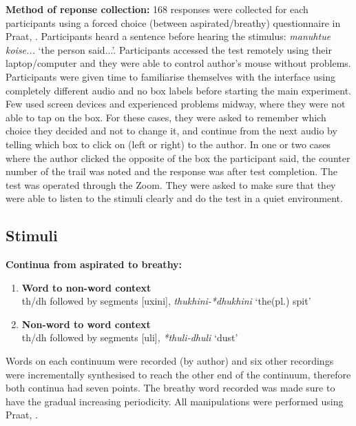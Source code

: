 \documentclass[12pt, english]{article}
\begin{document}
\textbf{Method of reponse collection:} 168 responses were collected for each participants using a forced choice (between aspirated/breathy) questionnaire in Praat, \cite{boersma2001praat}. Participants heard a sentence before hearing the stimulus: \textit{manuhtue koise...} `the person said...'. Participants accessed the test remotely using their laptop/computer and they were able to control author's mouse without problems. Participants were given time to familiarise themselves with the interface using completely different audio and no box labels before starting the main experiment. Few used screen devices and experienced problems midway, where they were not able to tap on the box. For these cases, they were asked to remember which choice they decided and not to change it, and continue from the next audio by telling which box to click on (left or right) to the author. In one or two cases where the author clicked the opposite of the box the participant said, the counter number of the trail was noted and the response was after test completion. The test was operated through the Zoom. They were asked to make sure that they were able to listen to the stimuli clearly and do the test in a quiet environment.


\subsection*{Stimuli}
\textbf{Continua from aspirated to breathy:} \par
\begin{enumerate}
    \item \textbf{Word to non-word context} \\
    th/dh followed by segments [uxini], \textit{thukhini-*dhukhini} `the(pl.) spit'
    \item \textbf{Non-word to word context} \\
    th/dh followed by segments [uli], \textit{*thuli-dhuli} `dust' \par
\end{enumerate}

Words on each continuum were recorded (by author) and six other recordings were incrementally synthesised to reach the other end of the continuum, therefore both continua had seven points. The breathy word recorded was made sure to have the gradual increasing periodicity. All manipulations were performed using Praat, \cite{boersma2001praat}. \\ \par
\end{document}
